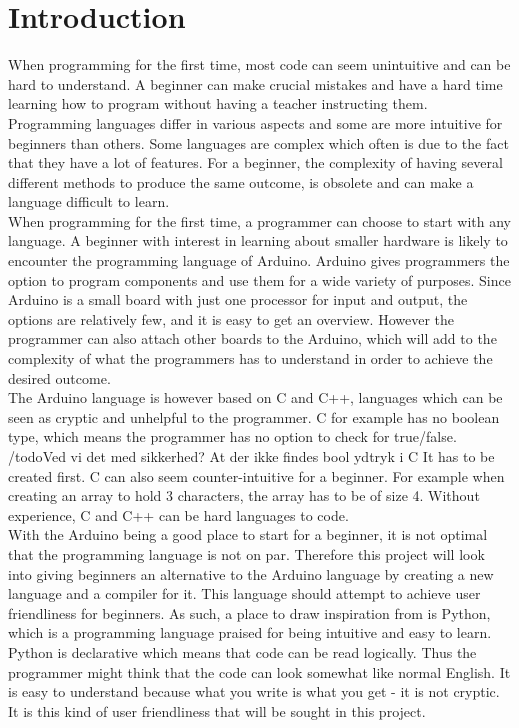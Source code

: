 \section{Introduction}
When programming for the first time, most code can seem unintuitive and can be hard to understand. A beginner can make crucial mistakes and have a hard time learning how to program without having a teacher instructing them.\\

Programming languages differ in various aspects and some are more intuitive for beginners than others. Some languages are complex which often is due to the fact that they have a lot of features. For a beginner, the complexity of having several different methods to produce the same outcome, is obsolete and can make a language difficult to learn. \\

When programming for the first time, a programmer can choose to start with any language. A beginner with interest in learning about smaller hardware is likely to encounter the programming language of Arduino. Arduino gives programmers the option to program components and use them for a wide variety of purposes. Since Arduino is a small board with just one processor for input and output, the options are relatively few, and it is easy to get an overview. However the programmer can also attach other boards to the Arduino, which will add to the complexity of what the programmers has to understand in order to achieve the desired outcome. \\

The Arduino language is however based on C and C++, languages which can be seen as cryptic and unhelpful to the programmer. C for example has no boolean type, which means the programmer has no option to check for true/false. /todo{Ved vi det med sikkerhed? At der ikke findes bool ydtryk i C} It has to be created first. C can also seem counter-intuitive for a beginner. For example when creating an array to hold 3 characters, the array has to be of size 4.  Without experience, C and C++ can be hard languages to code. \\

With the Arduino being a good place to start for a beginner, it is not optimal that the programming language is not on par.  Therefore this project will look into giving beginners an alternative to the Arduino language by creating a new language and a compiler for it. This language should attempt to achieve user friendliness for beginners. As such, a place to draw inspiration from is Python, which is a programming language praised for being intuitive and easy to learn. Python is declarative which means that code can be read logically. Thus the programmer might think that the code can look somewhat like normal English. It is easy to understand because what you write is what you get - it is not cryptic. It is this kind of user friendliness that will be sought in this project.